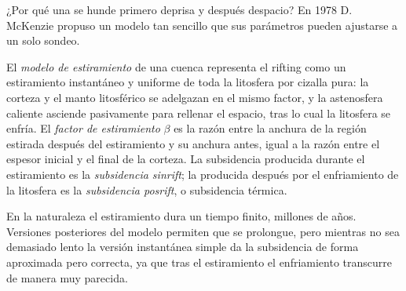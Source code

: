 ¿Por qué una  se hunde primero deprisa y después despacio? En 1978 D. McKenzie propuso un modelo tan
sencillo que sus parámetros pueden ajustarse a un solo sondeo.

\begin{definition}\label{def:b2:basins-compared:stretching}
El \emph{modelo de estiramiento} de una cuenca representa el rifting como un
estiramiento instantáneo y uniforme de toda la litosfera por cizalla pura: la corteza y el manto
litosférico se adelgazan en el mismo factor, y la astenosfera caliente asciende pasivamente para rellenar el
espacio, tras lo cual la litosfera se enfría. El \emph{factor de estiramiento}
$\beta$ es la razón entre la anchura de la región estirada después del estiramiento y su anchura antes,
igual a la razón entre el espesor inicial y el final de la corteza. La subsidencia producida
durante el estiramiento es la \emph{subsidencia sinrift}; la producida
después por el enfriamiento de la litosfera es la \emph{subsidencia
posrift}, o subsidencia térmica.
\end{definition}

En la naturaleza el estiramiento dura un tiempo finito, millones de años. Versiones posteriores del modelo permiten que
se prolongue, pero mientras no sea demasiado lento la versión instantánea simple da la subsidencia
de forma aproximada pero correcta, ya que tras el estiramiento el enfriamiento transcurre de manera muy parecida.

